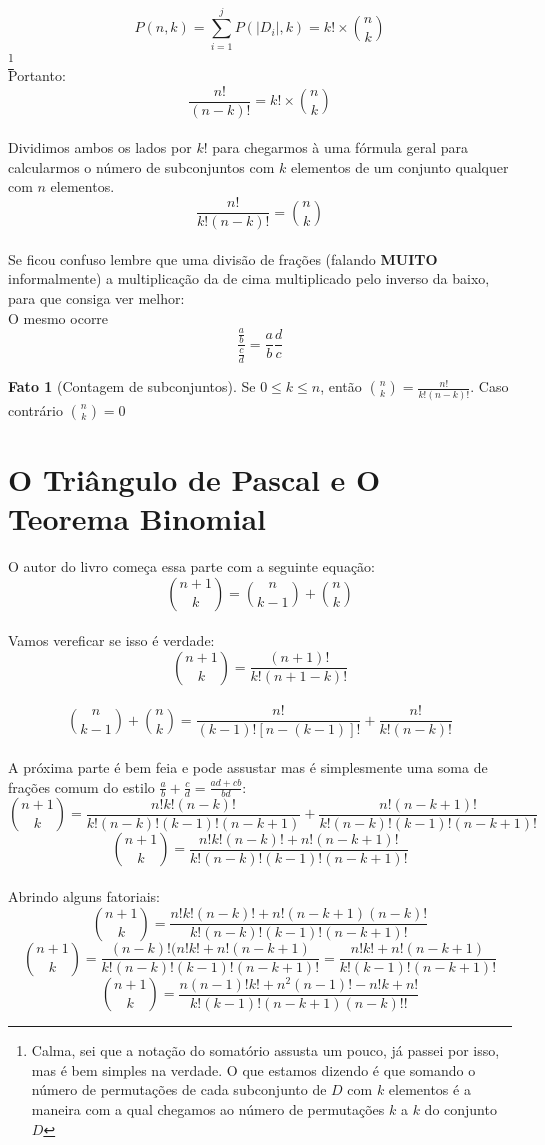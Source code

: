 \documentclass[a4paper,11pt]{book}
\theoremstyle{definition}
\theoremstyle{break}
\newtheorem{fact}{Fato}[section]
\begin{document}
\\
$$P(n,k) = \sum\limits_{i=1}^j P(|D_i|, k) = k! \times {n \choose k}$$ \footnote{Calma, sei que a notação do somatório assusta um pouco, já passei por isso, mas é bem simples na verdade. O que estamos dizendo é que somando o número de permutações de cada subconjunto de $D$ com $k$ elementos é a maneira com a qual chegamos ao número de permutações $k$ a $k$ do conjunto $D$}
\\
Portanto:
\\
$$\frac{n!}{(n-k)!} = k! \times {n \choose k}$$
\\
Dividimos ambos os lados por $k!$ para chegarmos à uma fórmula geral para calcularmos o número de subconjuntos com $k$ elementos de um conjunto qualquer com $n$ elementos.
$$\frac{n!}{k!(n-k)!} = {n \choose k}$$
\\
Se ficou confuso lembre que uma divisão de frações (falando \textbf{MUITO} informalmente) a multiplicação da de cima multiplicado pelo inverso da baixo, para que consiga ver melhor:
\\
O mesmo ocorre 
$$\frac{\frac{a}{b}}{\frac{c}{d}} = \frac{a}{b} \frac{d}{c}$$
\begin{fact}[Contagem de subconjuntos]
Se $0 \leqslant k \leqslant n$, então ${n \choose k} = \frac{n!}{k!(n-k)!}$. Caso contrário ${n \choose k} = 0$
\end{fact}

\section{O Triângulo de Pascal e O Teorema Binomial}
O autor do livro começa essa parte com a seguinte equação:
\\
$$ {n+1 \choose k} = {n \choose k-1} + {n \choose k} $$
\\
Vamos vereficar se isso é verdade:
$$ {n+1 \choose k} = \frac{(n+1)!}{k!(n+1-k)!}$$
\\
$${n \choose k-1} + {n \choose k} = \frac{n!}{(k-1)![n-(k-1)]!} + \frac{n!}{k!(n-k)!}$$
\\
A próxima parte é bem feia e pode assustar mas é simplesmente uma soma de frações comum do estilo $\frac{a}{b} + \frac{c}{d} = \frac{ad+cb}{bd}$:
$${n+1 \choose k} = \frac{n!k!(n-k)!}{k!(n-k)!(k-1)!(n-k+1)} + \frac{n!(n-k+1)!}{k!(n-k)!(k-1)!(n-k+1)!}$$
$${n+1 \choose k} = \frac{n!k!(n-k)! + n!(n-k+1)!}{k!(n-k)!(k-1)!(n-k+1)!}$$
\\
Abrindo alguns fatoriais:
$${n+1 \choose k} = \frac{n!k!(n-k)! + n!(n-k+1)(n-k)!}{k!(n-k)!(k-1)!(n-k+1)!}$$
$${n+1 \choose k} = \frac{(n-k)!(n!k! + n!(n-k+1)}{k!(n-k)!(k-1)!(n-k+1)!} = \frac{n!k! + n!(n-k+1)}{k!(k-1)!(n-k+1)!}$$
$${n+1 \choose k} = \frac{n(n-1)!k! + n^2(n-1)! - n!k + n!}{k!(k-1)!(n-k+1)(n-k)!!}$$
\end{document}
